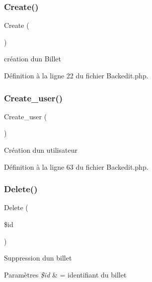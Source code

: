 \subsubsection{\texorpdfstring{Create()}{Create()}}
{\footnotesize\ttfamily Create (\begin{DoxyParamCaption}{ }\end{DoxyParamCaption})}

création d\textquotesingle{}un Billet 

Définition à la ligne 22 du fichier Backedit.\+php.

\mbox{\label{class_src_1_1_controllers_1_1_backedit_af3369c06390987c5f54b6bc444c615ee}} 
\subsubsection{\texorpdfstring{Create\+\_\+user()}{Create\_user()}}
{\footnotesize\ttfamily Create\+\_\+user (\begin{DoxyParamCaption}{ }\end{DoxyParamCaption})}

Création d\textquotesingle{}un utilisateur 

Définition à la ligne 63 du fichier Backedit.\+php.

\mbox{\label{class_src_1_1_controllers_1_1_backedit_a59113b5ecd1d155db6a4f30af34a1e80}} 
\subsubsection{\texorpdfstring{Delete()}{Delete()}}
{\footnotesize\ttfamily Delete (\begin{DoxyParamCaption}\item[{}]{\$id }\end{DoxyParamCaption})}

Suppression d\textquotesingle{}un billet 
\begin{DoxyParams}{Paramètres}
{\em \$id} & = identifiant du billet \\
\hline
\end{DoxyParams}


